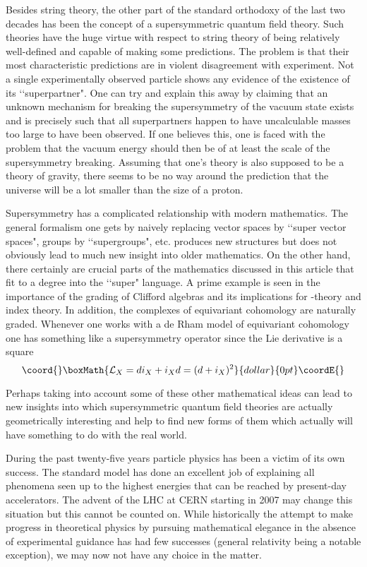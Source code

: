 \documentclass[a4paper,a4paper]{article}
\theoremstyle{conjecture}
\begin{document}
Besides string theory, the other part of the standard orthodoxy of the last two decades has
been the concept of a supersymmetric quantum field theory.  Such theories have the huge virtue
with respect to string theory of being relatively well-defined and capable of making some predictions.
The problem is that their most characteristic predictions are in violent disagreement with
experiment.  Not a single experimentally observed particle shows any evidence of the existence
of its \lq\lq superpartner".  One can try and explain this away by claiming that an unknown
mechanism for breaking the supersymmetry of the vacuum state exists and is precisely such that
all superpartners happen to have uncalculable masses too large to have been observed.  If one 
believes this,  one is faced with the problem that the vacuum energy should then be of at least
the scale of the supersymmetry breaking.  Assuming that one's theory is also supposed to be
a theory of gravity, there seems to be no way around the prediction that the universe will be
a lot smaller than the size of a proton.

Supersymmetry has a complicated relationship with modern mathematics. The general formalism one gets by naively replacing
vector spaces by \lq\lq super vector spaces", groups by \lq\lq supergroups", etc. produces new structures but does not
obviously lead to much new insight into older mathematics. On the other hand, there certainly are crucial parts of the
mathematics discussed in this article that fit to a degree into the \lq\lq super" language. A prime example is seen in the
importance of the \coordHE{} grading of Clifford algebras and its implications for \coordHE{}-theory and index theory.  In addition,
the complexes of equivariant cohomology are naturally \coordHE{} graded. Whenever one works with a de Rham model of equivariant
cohomology one has something like a supersymmetry operator since the Lie derivative is a square $$\coord{}\boxMath{\mathcal L_X=di_X
+i_Xd=(d+i_X)^2}{dollar}{0pt}\coordE{}$$

Perhaps taking into account some of these other mathematical ideas can lead to new insights into which
supersymmetric quantum field theories are actually geometrically interesting and help to find new
forms of them which actually will have something to do with the real world.  

During the past twenty-five years particle physics has been a victim of its own success.  The standard
model has done an excellent job of explaining all phenomena seen up to the highest energies
that can be reached by present-day accelerators.  The advent of the LHC at CERN starting in 2007 may
change this situation but this cannot be counted on.  While historically the attempt to make progress
in theoretical physics by pursuing mathematical elegance in the absence of experimental guidance has
had few successes (general relativity being a notable exception), we may now not have any choice in
the matter.
\end{document}

